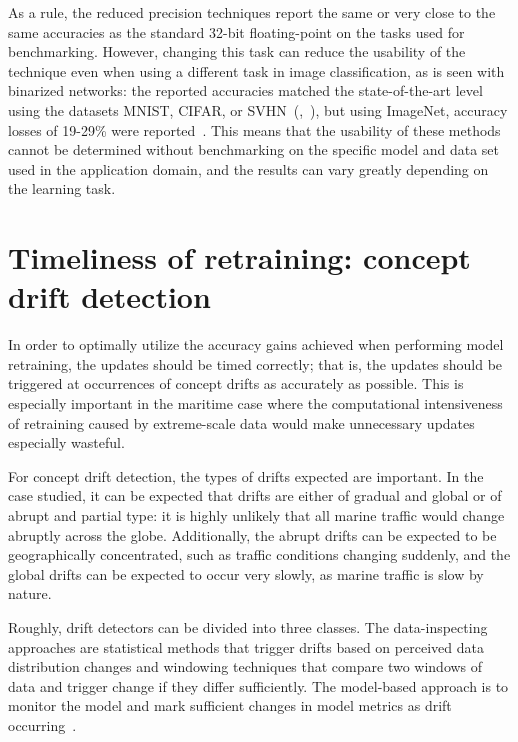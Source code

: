 As a rule, the reduced precision techniques report the same or very close to the same accuracies as the standard 32-bit floating-point on the tasks used for benchmarking. However, changing this task can reduce the usability of the technique even when using a different task in image classification, as is seen with binarized networks: the reported accuracies matched the state-of-the-art level using the datasets MNIST, CIFAR, or SVHN~(\cite{courbariauxBinarizedNeuralNetworks2016},~\cite{courbariauxBinaryConnectTrainingDeep2016}), but using ImageNet, accuracy losses of 19-29\% were reported~\cite{rastegariXNORNetImageNetClassification2016}. This means that the usability of these methods cannot be determined without benchmarking on the specific model and data set used in the application domain, and the results can vary greatly depending on the learning task.

\section{Timeliness of retraining: concept drift detection}

In order to optimally utilize the accuracy gains achieved when performing model retraining, the updates should be timed correctly; that is, the updates should be triggered at occurrences of concept drifts as accurately as possible. This is especially important in the maritime case where the computational intensiveness of retraining caused by extreme-scale data would make unnecessary updates especially wasteful.

For concept drift detection, the types of drifts expected are important. In the case studied, it can be expected that drifts are either of gradual and global or of abrupt and partial type: it is highly unlikely that all marine traffic would change abruptly across the globe. Additionally, the abrupt drifts can be expected to be geographically concentrated, such as traffic conditions changing suddenly, and the global drifts can be expected to occur very slowly, as marine traffic is slow by nature.

Roughly, drift detectors can be divided into three classes. The data-inspecting approaches are statistical methods that trigger drifts based on perceived data distribution changes and windowing techniques that compare two windows of data and trigger change if they differ sufficiently. The model-based approach is to monitor the model and mark sufficient changes in model metrics as drift occurring~\cite{faithfullUnsupervisedChangeDetection2018}.

